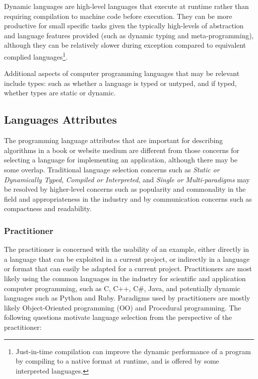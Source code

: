 \documentclass[a4paper, 11pt]{article}
\begin{document}
Dynamic languages are high-level languages that execute at runtime rather than requiring compilation to machine code before execution. They can be more productive for small specific tasks given the typically high-levels of abstraction and language features provided (such as dynamic typing and meta-programming), although they can be relatively slower during exception compared to equivalent complied languages\footnote{Just-in-time compilation can improve the dynamic performance of a program by compiling to a native format at runtime, and is offered by some interpreted languages.}.

Additional aspects of computer programming languages that may be relevant include types: such as whether a language is typed or untyped, and if typed, whether types are static or dynamic.

% 
%
\subsection{Languages Attributes}
The programming language attributes that are important for describing algorithms in a book or website medium are different from those concerns for selecting a language for implementing an application, although there may be some overlap.
Traditional language selection concerns such as \emph{Static or Dynamically Typed}, \emph{Compiled or Interpreted}, and \emph{Single or Multi-paradigms} may be resolved by higher-level concerns such as popularity and commonality in the field and appropriateness in the industry and by communication concerns such as compactness and readability.

\subsubsection{Practitioner}
The practitioner is concerned with the usability of an example, either directly in a language that can be exploited in a current project, or indirectly in a language or format that can easily be adapted for a current project.
Practitioners are most likely using the common languages in the industry for scientific and application computer programming, such as C, C++, C\#, Java, and potentially dynamic languages such as Python and Ruby. Paradigms used by practitioners are mostly likely Object-Oriented programming (OO) and Procedural programming.
The following questions motivate language selection from the perspective of the practitioner:
\end{document}
